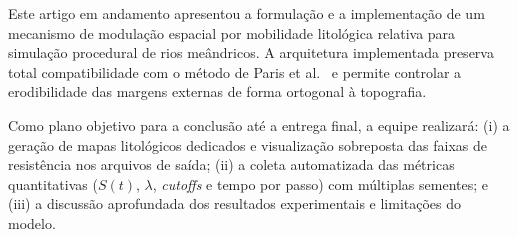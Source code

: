 \documentclass[10pt,twocolumn,a4paper]{article}
\begin{document}
Este artigo em andamento apresentou a formulação e a implementação de um mecanismo de modulação espacial por mobilidade litológica relativa para simulação procedural de rios meândricos. A arquitetura implementada preserva total compatibilidade com o método de Paris et al.~\cite{paris2023meandering} e permite controlar a erodibilidade das margens externas de forma ortogonal à topografia.

Como plano objetivo para a conclusão até a entrega final, a equipe realizará: (i) a geração de mapas litológicos dedicados e visualização sobreposta das faixas de resistência nos arquivos de saída; (ii) a coleta automatizada das métricas quantitativas ($S(t)$, $\lambda$, \textit{cutoffs} e tempo por passo) com múltiplas sementes; e (iii) a discussão aprofundada dos resultados experimentais e limitações do modelo.



\end{document}
